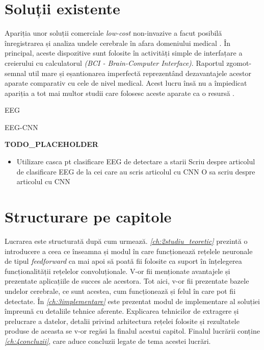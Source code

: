 \section{Soluții existente}
Apariția unor soluții comerciale \textit{low-cost} non-invazive a facut posibilă înregistrarea și analiza undele cerebrale în afara domeniului medical \cite{online:emotiv}. În principal, aceste dispozitive sunt folosite în activități simple de interfațare a creierului cu calculatorul \textit{(BCI - Brain-Computer Interface)}. Raportul zgomot-semnal util mare și eșantionarea imperfectă reprezentând dezavantajele acestor aparate comparativ cu cele de nivel medical. Acest lucru însă nu a împiedicat apariția a tot mai multor studii care folosesc aceste aparate ca o resursă \cite{consumer-eeg:2018}.



EEG\cite{EEG:2018}

EEG-CNN\cite{EEG-CNN:2020}

\textbf{TODO\_PLACEHOLDER}
\begin{itemize}
	\item Utilizare casca pt clasificare EEG de detectare a starii
	\subitem Scriu despre articolul de clasificare EEG de la cei care au scris articolul cu CNN
	\subitem O sa scriu despre articolul cu CNN
\end{itemize}
\section{Structurare pe capitole}
Lucrarea este structurată după cum urmează. \textit{\autoref{ch:2studiu_teoretic}} prezintă o introducere a ceea ce înseamna și modul în care funcționează rețelele neuronale de tipul \textit{feedforward} ca mai apoi să poată fii folosite ca suport în înțelegerea funcționalității rețelelor convoluționale. V-or fii menționate avantajele și prezentate aplicațiile de succes ale acestora. Tot aici, v-or fii prezentate bazele undelor cerebrale, ce sunt acestea, cum funcționează și felul în care pot fii detectate. În \textit{\autoref{ch:3implementare}} este prezentat modul de implementare al soluției împreună cu detaliile tehnice aferente. Explicarea tehnicilor de extragere și prelucrare a datelor, detalii privind arhitectura rețelei folosite și rezultatele produse de aceasta se v-or regăsi la finalul acestui capitol. Finalul lucrării conține \textit{\autoref{ch:4concluzii}}, care aduce concluzii legate de tema acestei lucrări.